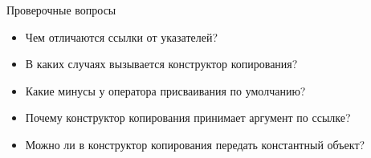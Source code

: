\documentclass[aspectratio=169,14pt]{beamer}
\begin{document}
    \begin{frame}[fragile]{Проверочные вопросы}
        \begin{itemize}
            \item Чем отличаются ссылки от указателей?
            \item В каких случаях вызывается конструктор копирования?
            \item Какие минусы у оператора присваивания по умолчанию?
            \item Почему конструктор копирования принимает аргумент по ссылке?
            \item Можно ли в конструктор копирования передать константный объект?
        \end{itemize}
    \end{frame}

    \qnaframe
\end{document}
